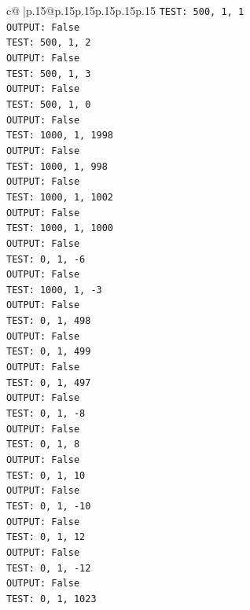 \documentclass{article}
\begin{document}
{\begin{supertabular}{c@{$\;$}|p{.15\linewidth}@{}p{.15\linewidth}p{.15\linewidth}p{.15\linewidth}p{.15\linewidth}p{.15\linewidth}}
{{{\texttt{TEST: 500, 1, 1} \\
\texttt{OUTPUT: False} \\
\texttt{TEST: 500, 1, 2} \\
\texttt{OUTPUT: False} \\
\texttt{TEST: 500, 1, 3} \\
\texttt{OUTPUT: False} \\
\texttt{TEST: 500, 1, 0} \\
\texttt{OUTPUT: False} \\
\texttt{TEST: 1000, 1, 1998} \\
\texttt{OUTPUT: False} \\
\texttt{TEST: 1000, 1, 998} \\
\texttt{OUTPUT: False} \\
\texttt{TEST: 1000, 1, 1002} \\
\texttt{OUTPUT: False} \\
\texttt{TEST: 1000, 1, 1000} \\
\texttt{OUTPUT: False} \\
\texttt{TEST: 0, 1, {-}6} \\
\texttt{OUTPUT: False} \\
\texttt{TEST: 1000, 1, {-}3} \\
\texttt{OUTPUT: False} \\
\texttt{TEST: 0, 1, 498} \\
\texttt{OUTPUT: False} \\
\texttt{TEST: 0, 1, 499} \\
\texttt{OUTPUT: False} \\
\texttt{TEST: 0, 1, 497} \\
\texttt{OUTPUT: False} \\
\texttt{TEST: 0, 1, {-}8} \\
\texttt{OUTPUT: False} \\
\texttt{TEST: 0, 1, 8} \\
\texttt{OUTPUT: False} \\
\texttt{TEST: 0, 1, 10} \\
\texttt{OUTPUT: False} \\
\texttt{TEST: 0, 1, {-}10} \\
\texttt{OUTPUT: False} \\
\texttt{TEST: 0, 1, 12} \\
\texttt{OUTPUT: False} \\
\texttt{TEST: 0, 1, {-}12} \\
\texttt{OUTPUT: False} \\
\texttt{TEST: 0, 1, 1023} \\
}}}
\end{supertabular}}
\end{document}

